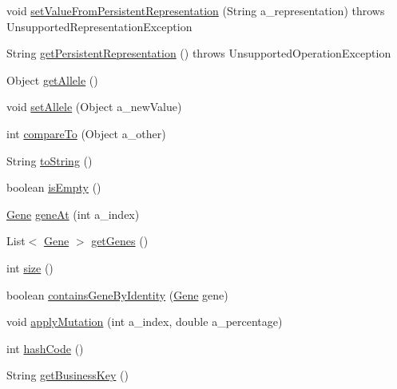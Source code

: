 \begin{DoxyCompactItemize}
\item 
void \hyperlink{classorg_1_1jgap_1_1impl_1_1_composite_gene_abd62d1ccb9e0753b93d11a89fd055d0e}{set\-Value\-From\-Persistent\-Representation} (String a\-\_\-representation)  throws Unsupported\-Representation\-Exception 
\item 
String \hyperlink{classorg_1_1jgap_1_1impl_1_1_composite_gene_ad33dc860fffad1457c3f44a8b3b031f7}{get\-Persistent\-Representation} ()  throws Unsupported\-Operation\-Exception 
\item 
Object \hyperlink{classorg_1_1jgap_1_1impl_1_1_composite_gene_a06d9f8415a3386a04b4eebc12850dbcf}{get\-Allele} ()
\item 
void \hyperlink{classorg_1_1jgap_1_1impl_1_1_composite_gene_a9e22ec1330a1b2009da1f587c299ed74}{set\-Allele} (Object a\-\_\-new\-Value)
\item 
int \hyperlink{classorg_1_1jgap_1_1impl_1_1_composite_gene_ab05429ae96ad205f88855f6dbe242638}{compare\-To} (Object a\-\_\-other)
\item 
String \hyperlink{classorg_1_1jgap_1_1impl_1_1_composite_gene_ad30baf0c08afe2bba30d25ada096d88a}{to\-String} ()
\item 
boolean \hyperlink{classorg_1_1jgap_1_1impl_1_1_composite_gene_a18ca33f66617e762ee657212866f6b7c}{is\-Empty} ()
\item 
\hyperlink{interfaceorg_1_1jgap_1_1_gene}{Gene} \hyperlink{classorg_1_1jgap_1_1impl_1_1_composite_gene_aa5c573b6b4343fe76163357c021e35ce}{gene\-At} (int a\-\_\-index)
\item 
List$<$ \hyperlink{interfaceorg_1_1jgap_1_1_gene}{Gene} $>$ \hyperlink{classorg_1_1jgap_1_1impl_1_1_composite_gene_ac8bb9bd8f19371c51a5231c6a1e9b4e9}{get\-Genes} ()
\item 
int \hyperlink{classorg_1_1jgap_1_1impl_1_1_composite_gene_ac6078356e9ce615740ab4e5fcd53b86a}{size} ()
\item 
boolean \hyperlink{classorg_1_1jgap_1_1impl_1_1_composite_gene_a2870d0e00136fa07477629ab04e91f96}{contains\-Gene\-By\-Identity} (\hyperlink{interfaceorg_1_1jgap_1_1_gene}{Gene} gene)
\item 
void \hyperlink{classorg_1_1jgap_1_1impl_1_1_composite_gene_a06e95c3f9f2d2d8784dc1ac0eaff49da}{apply\-Mutation} (int a\-\_\-index, double a\-\_\-percentage)
\item 
int \hyperlink{classorg_1_1jgap_1_1impl_1_1_composite_gene_a153d4e31eb61c134167102ced3aea71e}{hash\-Code} ()
\item 
String \hyperlink{classorg_1_1jgap_1_1impl_1_1_composite_gene_a0e0046a81c4adb9ff4d444c37e092b30}{get\-Business\-Key} ()
\end{DoxyCompactItemize}
